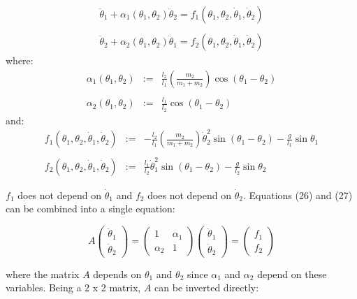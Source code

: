 \documentclass[12pt]{article}
\begin{document}
\begin{eqnarray}
    \ddot{\theta}_1 + \alpha_1(\theta_1,\theta_2)\ddot\theta_2 = f_1(\theta_1,\theta_2,\dot\theta_1,\dot\theta_2) \\
    \nonumber \\
    \ddot{\theta}_2 + \alpha_2(\theta_1,\theta_2)\ddot\theta_1 = f_2(\theta_1,\theta_2,\dot\theta_1,\dot\theta_2) 
\end{eqnarray}
where:
\begin{eqnarray}
    \alpha_1(\theta_1,\theta_2) &:=& \frac{l_2}{l_1}\left(\frac{m_2}{m_1 + m_2}\right)\cos(\theta_1 - \theta_2) \\
    \nonumber \\
    \alpha_2(\theta_1,\theta_2) &:=& \frac{l_1}{l_2}\cos(\theta_1 - \theta_2)
\end{eqnarray}
and:
\begin{eqnarray}
    f_1(\theta_1,\theta_2,\dot\theta_1,\dot\theta_2) &:=& -\frac{l_2}{l_1}\left(\frac{m_2}{m_1 + m_2}\right)\dot\theta_2^2\sin(\theta_1 - \theta_2) - \frac{g}{l_1}\sin\theta_1 \\
    \nonumber \\
    f_2(\theta_1,\theta_2,\dot\theta_1,\dot\theta_2) &:=& \frac{l_1}{l_2}\dot\theta_1^2\sin(\theta_1 - \theta_2) - \frac{g}{l_2}\sin\theta_2
\end{eqnarray}

$f_1$ does not depend on $\dot\theta_1$ and $f_2$ does not depend on $\dot\theta_2$. Equations (26) and (27) can be combined into a single equation:

\begin{equation}A\begin{pmatrix}
        \ddot{\theta}_1\\
        \ddot{\theta}_2
    \end{pmatrix}=\begin{pmatrix}
        1 & \alpha_1\\
        \alpha_2 & 1
    \end{pmatrix}\begin{pmatrix}
        \ddot{\theta}_1\\
        \ddot{\theta}_2
    \end{pmatrix}=\begin{pmatrix}
        f_1\\
        f_2
    \end{pmatrix}\end{equation}

where the matrix $A$ depends on $\theta_1$ and $\theta_2$ since $\alpha_1$ and $\alpha_2$ depend on these variables. Being a 2 x 2 matrix, $A$ can be inverted directly:
\end{document}
